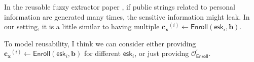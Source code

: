 In the reusable fuzzy extractor paper \cite{10.1145/1030083.1030096}, if public strings related to personal information are generated many times, the sensitive information might leak. In our setting, it is a little similar to having multiple $\mathbf{c_x}^{(i)} \gets \textsf{Enroll}(\textsf{esk}_i, \mathbf{b})$.

To model reusability, I think we can consider either providing $\mathbf{c_x}^{(i)} \gets \textsf{Enroll}(\textsf{esk}_i, \mathbf{b})$ for different $\textsf{esk}_i$, or just providng $\mathcal{O}^\prime_{\textsf{Enroll}}$.

\fi


\newpage



% 

\pagebreak

\nocite{*}
\printbibliography



